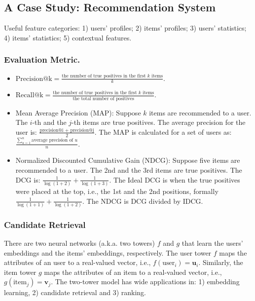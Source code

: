 \subsection{A Case Study: Recommendation System}
    Useful feature categories: 1) users' profiles; 2) items' profiles; 3) users' statistics; 4) items' statistics; 5) contextual features. 
    
        \subsubsection{Evaluation Metric.}
            \begin{itemize}
                \item $\text{Precision@k} = \frac{\text{the number of true positives in the first $k$ items}}{k}$.
                \item $\text{Recall@k} = \frac{\text{the number of true positives in the first $k$ items}}{\text{the total number of positives}}$.
                \item Mean Average Precision (MAP): Suppose $k$ items are recommended to a user. The $i$-th and the $j$-th items are true positives. The average precision for the user is: $\frac{\text{precision@i + precision@j}}{2}$. The MAP is calculated for a set of users as: $\frac{\sum_{u=1}^{n}{\text{average precision of $u$}}}{n}$.
                \item Normalized Discounted Cumulative Gain (NDCG): Suppose five items are recommended to a user. 
                      The 2nd and the 3rd items are true positives.
                      The DCG  is: $\frac{1}{\log{(1 + 2)}} + \frac{1}{\log{(1 + 3)}}$.
                      The Ideal DCG is when the true positives were placed at the top, i.e., the 1st and the 2nd positions, formally $\frac{1}{\log{(1 + 1)}} + \frac{1}{\log{(1 + 2)}}$.
                      The NDCG is DCG divided by IDCG. 
            \end{itemize}

    \subsubsection{Candidate Retrieval}
        There are two neural networks (a.k.a. two towers) $f$ and $g$ that learn the users' embeddings and the items' embeddings, respectively.
        The user tower $f$ maps the attributes of an user to a real-valued vector, i.e., $f(\text{user}_i) = \bm{u}_i$.
        Similarly, the item tower $g$ maps the attributes of an item to a real-valued vector, i.e., $g(\text{item}_j) = \bm{v}_j$.
        The two-tower model has wide applications in: 1) embedding learning, 2) candidate retrieval and 3) ranking. 

